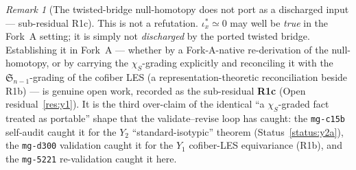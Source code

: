 \documentclass[11pt,oneside]{amsart}
\theoremstyle{plain}
\theoremstyle{definition}
\theoremstyle{remark}
\newtheorem{remark}[theorem]{Remark}
\theoremstyle{honeststyle}
\newcommand{\Sym}{\mathfrak{S}}
\newcommand{\walsh}[1]{\chi_{#1}}
\begin{document}
\begin{remark}[The twisted-bridge null-homotopy does not port as a
discharged input --- sub-residual R1c]
This is not a refutation. $\iota_x^{*}\simeq0$ may well be \emph{true}
in the Fork~A setting; it is simply not \emph{discharged} by the
ported twisted bridge. Establishing it in Fork~A --- whether by a
Fork-A-native re-derivation of the null-homotopy, or by carrying the
$\walsh{S}$-grading explicitly and reconciling it with the
$\Sym_{n-1}$-grading of the cofiber LES (a representation-theoretic
reconciliation beside R1b) --- is genuine open work, recorded as the
sub-residual \textbf{R1c} (Open residual~\ref{res:y1}). It is the
third over-claim of the identical ``a $\walsh{S}$-graded fact treated
as portable'' shape that the validate--revise loop has caught: the
\texttt{mg-c15b} self-audit caught it for the $Y_2$
``standard-isotypic'' theorem (Status~\ref{status:y2a}), the
\texttt{mg-d300} validation caught it for the $Y_1$ cofiber-LES
equivariance (R1b), and the \texttt{mg-5221} re-validation caught it
here.
\end{remark}
\end{document}
